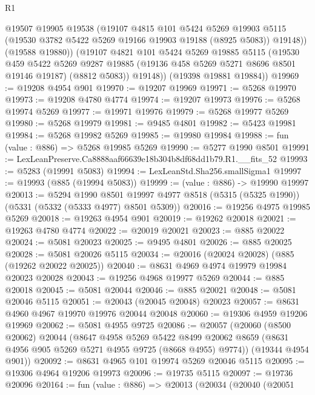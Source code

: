 \begin{lexlean}{R1}
\begin{coremodule}
            @19507
            @19905
            @19538
            (@19107
              @4815
              @101
              @5424
              @5269
              @19903
              @5115
              (@19530 @3782 @5422 @5269 @19166 @19903 @19188 (@8925 @5083))
              @19148))
          (@19588 @19880))
        (@19107
          @4821
          @101
          @5424
          @5269
          @19885
          @5115
          (@19530
            @459
            @5422
            @5269
            @9287
            @19885
            (@19136 @458 @5269 @5271 @8696 @8501 @19146 @19187)
            (@8812 @5083))
          @19148))
      (@19398 @19881 @19884))
@19969 := @19208 @4954 @901
@19970 := @19207 @19969
@19971 := @5268 @19970
@19973 := @19208 @4780 @4774
@19974 := @19207 @19973
@19976 := @5268 @19974 @5269
@19977 := @19971 @19976
@19979 := @5268 @19977 @5269
@19980 := @5268 @19979
@19981 := @9485 @4801
@19982 := @5423 @19981
@19984 := @5268 @19982 @5269
@19985 := @19980 @19984
@19988 := fun (value : @886) => @5268 @19985 @5269
@19990 := @5277 @1990 @8501
@19991 := LexLeanPreserve.Ca8888aaf66639e18b304b8df68dd1b79.R1.__fits_52
@19993 := @5283 (@19991 @5083)
@19994 := LexLeanStd.Sha256.smallSigma1
@19997 := @19993 (@885 (@19994 @5083))
@19999 := (value : @886) -> @19990 @19997
@20013 := @5294
    @1990
    @8501
    @19997
    @4977
    @8518
    (@5315 (@5325 @1990))
    (@5331 (@5332 (@5333 @4977) @8501 @5309))
@20016 := @19256 @4975 @19985 @5269
@20018 := @19263 @4954 @901
@20019 := @19262 @20018
@20021 := @19263 @4780 @4774
@20022 := @20019 @20021
@20023 := @885 @20022
@20024 := @5081 @20023
@20025 := @9495 @4801
@20026 := @885 @20025
@20028 := @5081 @20026 @5115
@20034 := @20016 (@20024 @20028) (@885 (@19262 @20022 @20025))
@20040 := @8631 @4969 @4974 @19979 @19984 @20023 @20028
@20043 := @19256 @4968 @19977 @5269
@20044 := @885 @20018
@20045 := @5081 @20044
@20046 := @885 @20021
@20048 := @5081 @20046 @5115
@20051 := @20043 (@20045 @20048) @20023
@20057 := @8631 @4960 @4967 @19970 @19976 @20044 @20048
@20060 := @19306 @4959 @19206 @19969
@20062 := @5081 @4955 @9725
@20086 := @20057
    (@20060
      (@8500 @20062)
      @20044
      (@8647
        @4958
        @5269
        @5422
        @8499
        @20062
        @8659
        (@8631 @4956 @905 @5269 @5271 @4955 @9725 (@8668 @4955) @9774))
      (@19344 @4954 @901))
@20092 := @8631 @4965 @101 @19974 @5269 @20046 @5115
@20095 := @19306 @4964 @19206 @19973
@20096 := @19735 @5115
@20097 := @19736 @20096
@20164 := fun (value : @886) =>
  @20013
    (@20034
      (@20040
        (@20051

\end{coremodule}
\end{lexlean}
